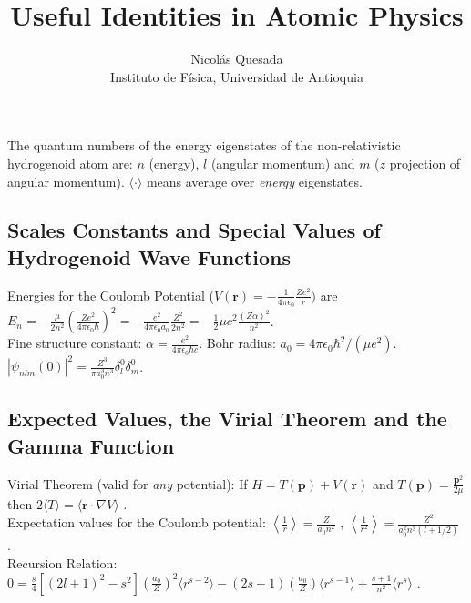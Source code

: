\documentclass[10.5pt,letterpaper]{article}
\title{Useful Identities in Atomic Physics}
\author{Nicol\'as Quesada\\{\small \sf Instituto de F\'isica, Universidad de Antioquia}}
\date{}
\begin{document}
\maketitle
\thispagestyle{empty}
\noindent The quantum numbers of the energy eigenstates of the non-relativistic hydrogenoid atom are: $n$ (energy), $l$ (angular momentum) and $m$ ($z$ projection of angular momentum). $\langle \cdot \rangle$ means average over \emph{energy} eigenstates.

\subsection*{Scales Constants and Special Values of Hydrogenoid Wave Functions}

Energies for the Coulomb Potential ($V(\textbf{r})=-\frac{1}{4 \pi \epsilon_0}\frac{Z e^2}{r})$ are $E_n=-\frac{\mu}{2n^2}\left( \frac{Ze^2}{4 \pi \epsilon_0 \hbar} \right)^2=-\frac{e^2}{4 \pi \epsilon_0 a_0} \frac{Z^2}{2 n^2}=-\frac{1}{2} \mu c^2 \frac{(Z \alpha)^2}{n ^2}$.\\

\noindent Fine structure constant: $\alpha=\frac{e^2}{4 \pi \epsilon_0 \hbar c}$. Bohr radius: $a_0=4 \pi \epsilon_0 \hbar^2/(\mu e^2)$. \space \space \space
$|\psi_{n l m}(0)|^2=\frac{Z^3}{\pi a_0^3 n^3} \delta_{l}^0 \delta_m^0$.

\subsection*{Expected Values, the Virial Theorem and the Gamma Function}

Virial Theorem (valid for \emph{any} potential): If $H=T(\textbf{p})+V(\textbf{r})$ and $T(\textbf{p})=\frac{\textbf{p}^2}{2\mu}$ then $2\langle T \rangle=\langle \textbf{r} \cdot \nabla V \rangle$ .\\

\noindent Expectation values for the Coulomb potential: $\left\langle \frac{1}{r} \right\rangle=\frac{Z}{a_0 n^2}$ , $\left\langle \frac{1}{r^2} \right\rangle=\frac{Z^2}{a_0^2 n^3 (l+1/2)}$ .\\

\noindent Recursion Relation: $0=\frac{s}{4}\left[(2 l+1)^2-s^2 \right] \left( \frac{a_0}{Z} \right)^2 \langle r^{s-2} \rangle-(2s+1)\left(\frac{a_0}{Z} \right) \langle r^{s-1} \rangle+\frac{s+1}{n^2} \langle r^s \rangle$ .\\
\end{document}
